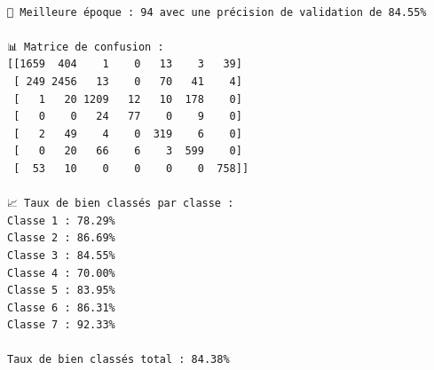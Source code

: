 \documentclass[
  letterpaper,
  DIV=11,
  numbers=noendperiod]{scrartcl}
\begin{document}
\begin{verbatim}

🔹 Meilleure époque : 94 avec une précision de validation de 84.55%

📊 Matrice de confusion :
[[1659  404    1    0   13    3   39]
 [ 249 2456   13    0   70   41    4]
 [   1   20 1209   12   10  178    0]
 [   0    0   24   77    0    9    0]
 [   2   49    4    0  319    6    0]
 [   0   20   66    6    3  599    0]
 [  53   10    0    0    0    0  758]]

📈 Taux de bien classés par classe :
Classe 1 : 78.29%
Classe 2 : 86.69%
Classe 3 : 84.55%
Classe 4 : 70.00%
Classe 5 : 83.95%
Classe 6 : 86.31%
Classe 7 : 92.33%

Taux de bien classés total : 84.38%
\end{verbatim}
\end{document}
